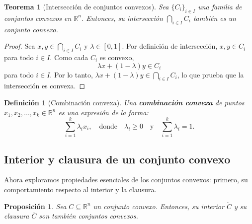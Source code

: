 \documentclass[12pt]{book}
\newtheorem{theorem}{Teorema}
\newtheorem{proposition}{Proposición}
\newtheorem{definition}{Definición}
\theoremstyle{definition}
\theoremstyle{plain}
\theoremstyle{remark}
\begin{document}
\begin{theorem}[Intersección de conjuntos convexos]
    Sea \( \{C_i\}_{i \in I} \) una familia de conjuntos convexos en \( \mathbb{R}^n \). Entonces, su intersección \( \bigcap_{i \in I} C_i \) también es un conjunto convexo.
\end{theorem}

\begin{proof}
    Sea \( x, y \in \bigcap_{i \in I} C_i \) y \( \lambda \in [0,1] \). Por definición de intersección, \( x, y \in C_i \) para todo \( i \in I \). Como cada \( C_i \) es convexo, \[ \lambda x + (1-\lambda) y \in C_i \] para todo \( i \in I \). Por lo tanto, \( \lambda x + (1-\lambda) y \in \bigcap_{i \in I} C_i \), lo que prueba que la intersección es convexa.
\end{proof}

\begin{definition}[Combinación convexa]
    Una \textbf{combinación convexa} de puntos \( x_1, x_2, \dots, x_k \in \mathbb{R}^n \) es una expresión de la forma:
    \[
    \sum_{i=1}^k \lambda_i x_i, \quad \text{donde} \quad \lambda_i \geq 0 \quad \text{y} \quad \sum_{i=1}^k \lambda_i = 1.
    \]
\end{definition}

\subsection{Interior y clausura de un conjunto convexo}

Ahora
exploramos propiedades esenciales de los conjuntos convexos: primero, su comportamiento respecto al interior y la clausura. %

\begin{proposition}
    Sea \( C \subseteq \mathbb{R}^n \) un conjunto convexo. Entonces, su interior \( \mathring{C} \) y su clausura \( \overline{C} \) son también conjuntos convexos.
\end{proposition}
\end{document}
